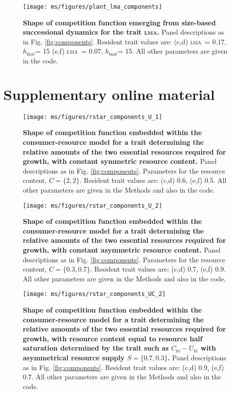 \documentclass[a4paper,11pt]{article}
\newcommand{\hmat}{\ensuremath{h_{\text{mat}}}}
\newcommand{\lma}{\textsc{lma}}
\begin{document}
\clearpage

\begin{figure}[ht]
 \centering
 \texttt{[image: ms/figures/plant\_lma\_components]}
 \caption{{\bf Shape of competition function emerging from size-based successional dynamics for the trait \lma.} 
 Panel descriptions as in Fig. \ref{fig:components}. Resident trait values are: (c,d) \lma\ = 0.17, \hmat = 15 (e,f) \lma\ = 0.07, \hmat = 15. All other parameters are given in the code.}
 \label{fig:plant_lma}
\end{figure}

\clearpage




\clearpage

\section{Supplementary online material}


\begin{figure}[ht]
 \centering
	\texttt{[image: ms/figures/rstar\_components\_U\_1]}
 \caption{{\bf Shape of competition function embedded within the consumer-resource model for a trait determining the relative amounts of the two essential resources required for growth, with constant symmetric resource content.} Panel descriptions as in Fig. \ref{fig:components}. Parameters for the resource content, $C = \{2, 2\}$. Resident trait values are: (c,d) 0.6, (e,f) 0.5. All other parameters are given in the Methods and also in the code.}
 \label{figS:Rstar_U1}
\end{figure}

\newpage
\begin{figure}[ht]
 \centering
	\texttt{[image: ms/figures/rstar\_components\_U\_2]}
 \caption{{\bf Shape of competition function embedded within the consumer-resource model for a trait determining the relative amounts of the two essential resources required for growth, with constant asymmetric resource content.} Panel descriptions as in Fig. \ref{fig:components}. Parameters for the resource content, $C = \{0.3, 0.7\}$. Resident trait values are: (c,d) 0.7, (e,f) 0.9. All other parameters are given in the Methods and also in the code.}
 \label{figS:Rstar_U2}
\end{figure}

\newpage
\begin{figure}[ht]
 \centering
 \texttt{[image: ms/figures/rstar\_components\_UC\_2]}
 \caption{{\bf Shape of competition function embedded within the consumer-resource model for a trait determining the relative amounts of the two essential resources required for growth, with resource content equal to resource half saturation determined by the trait such as $C_{ki} - U_{ki}$ with asymmetrical resource supply $S = \{0.7, 0.3\}$.} Panel descriptions as in Fig. \ref{fig:components}. Resident trait values are: (c,d) 0.9, (e,f) 0.7. All other parameters are given in the Methods and also in the code.} 
 \label{fig:Srstar_components_UC2}
\end{figure}
\end{document}

